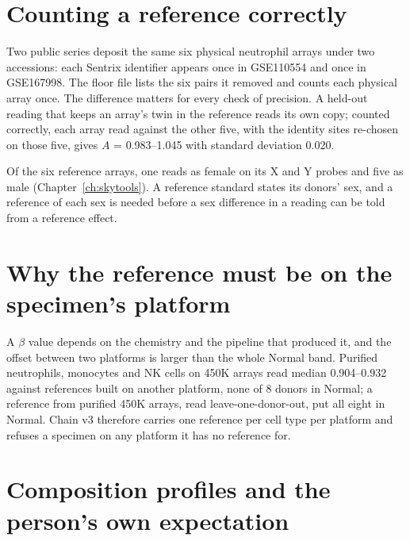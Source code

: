 \section{Counting a reference correctly}

Two public series deposit the same six physical neutrophil arrays under two accessions: each Sentrix identifier appears once in GSE110554 and once in
GSE167998. The floor file lists the six pairs it removed and counts each physical array once. \measured{} The difference matters for every check of precision. A held-out reading that keeps an array's twin in the
reference reads its own copy; counted correctly, each array read against the other five, with the identity sites re-chosen on those five, gives $A$ =
0.983--1.045 with standard deviation 0.020. \measured

Of the six reference arrays, one reads as female on its X and Y probes and five as male (Chapter~\ref{ch:skytools}). \measured{} A reference standard
states its donors' sex, and a reference of each sex is needed before a sex difference in a reading can be told from a reference effect. \openprob

\section{Why the reference must be on the specimen's platform}

A $\beta$ value depends on the chemistry and the pipeline that produced it, and the offset between two platforms is larger than the whole Normal band.
Purified neutrophils, monocytes and NK cells on 450K arrays read median 0.904--0.932 against references built on another platform, none of 8 donors in Normal; a reference from
purified 450K arrays, read leave-one-donor-out, put all eight in Normal. \measured{} Chain v3
therefore carries one reference per cell type per platform and refuses a specimen on any platform it has no reference for.

\section{Composition profiles and the person's own expectation}

